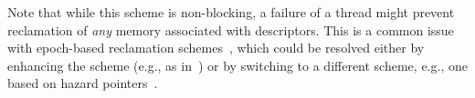 Note that while this scheme is non-blocking, a failure of a thread might prevent reclamation of \emph{any} memory associated with descriptors.
This is a common issue with epoch-based reclamation schemes~\cite{DHK16}, which could be resolved either by 
enhancing the scheme (e.g., as in~\cite{Brown15}) or by switching to a different scheme, e.g., one based on hazard pointers~\cite{DHK16,Michael04}.


